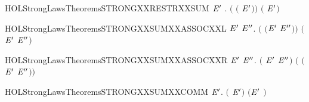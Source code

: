\begin{SaveVerbatim}{HOLStrongLawsTheoremsSTRONGXXRESTRXXSUM}
\HOLTokenTurnstile{} \HOLSymConst{\HOLTokenForall{}} \ensuremath{\HOLBoundVar{E}\sp{\prime{}}} .  \ensuremath{(}  \ensuremath{(} \HOLSymConst{\ensuremath{+}} \ensuremath{\HOLBoundVar{E}\sp{\prime{}}}\ensuremath{)}\ensuremath{)} \ensuremath{(}   \HOLSymConst{\ensuremath{+}}   \ensuremath{\HOLBoundVar{E}\sp{\prime{}}}\ensuremath{)}
\end{SaveVerbatim}
\newcommand{\HOLStrongLawsTheoremsSTRONGXXRESTRXXSUM}{\UseVerbatim{HOLStrongLawsTheoremsSTRONGXXRESTRXXSUM}}
\begin{SaveVerbatim}{HOLStrongLawsTheoremsSTRONGXXSUMXXASSOCXXL}
\HOLTokenTurnstile{} \HOLSymConst{\HOLTokenForall{}} \ensuremath{\HOLBoundVar{E}\sp{\prime{}}} \ensuremath{\HOLBoundVar{E}\sp{\prime{}\prime{}}}.  \ensuremath{(} \HOLSymConst{\ensuremath{+}} \ensuremath{(}\ensuremath{\HOLBoundVar{E}\sp{\prime{}}} \HOLSymConst{\ensuremath{+}} \ensuremath{\HOLBoundVar{E}\sp{\prime{}\prime{}}}\ensuremath{)}\ensuremath{)} \ensuremath{(} \HOLSymConst{\ensuremath{+}} \ensuremath{\HOLBoundVar{E}\sp{\prime{}}} \HOLSymConst{\ensuremath{+}} \ensuremath{\HOLBoundVar{E}\sp{\prime{}\prime{}}}\ensuremath{)}
\end{SaveVerbatim}
\newcommand{\HOLStrongLawsTheoremsSTRONGXXSUMXXASSOCXXL}{\UseVerbatim{HOLStrongLawsTheoremsSTRONGXXSUMXXASSOCXXL}}
\begin{SaveVerbatim}{HOLStrongLawsTheoremsSTRONGXXSUMXXASSOCXXR}
\HOLTokenTurnstile{} \HOLSymConst{\HOLTokenForall{}} \ensuremath{\HOLBoundVar{E}\sp{\prime{}}} \ensuremath{\HOLBoundVar{E}\sp{\prime{}\prime{}}}.  \ensuremath{(} \HOLSymConst{\ensuremath{+}} \ensuremath{\HOLBoundVar{E}\sp{\prime{}}} \HOLSymConst{\ensuremath{+}} \ensuremath{\HOLBoundVar{E}\sp{\prime{}\prime{}}}\ensuremath{)} \ensuremath{(} \HOLSymConst{\ensuremath{+}} \ensuremath{(}\ensuremath{\HOLBoundVar{E}\sp{\prime{}}} \HOLSymConst{\ensuremath{+}} \ensuremath{\HOLBoundVar{E}\sp{\prime{}\prime{}}}\ensuremath{)}\ensuremath{)}
\end{SaveVerbatim}
\newcommand{\HOLStrongLawsTheoremsSTRONGXXSUMXXASSOCXXR}{\UseVerbatim{HOLStrongLawsTheoremsSTRONGXXSUMXXASSOCXXR}}
\begin{SaveVerbatim}{HOLStrongLawsTheoremsSTRONGXXSUMXXCOMM}
\HOLTokenTurnstile{} \HOLSymConst{\HOLTokenForall{}} \ensuremath{\HOLBoundVar{E}\sp{\prime{}}}.  \ensuremath{(} \HOLSymConst{\ensuremath{+}} \ensuremath{\HOLBoundVar{E}\sp{\prime{}}}\ensuremath{)} \ensuremath{(}\ensuremath{\HOLBoundVar{E}\sp{\prime{}}} \HOLSymConst{\ensuremath{+}} \ensuremath{)}
\end{SaveVerbatim}
